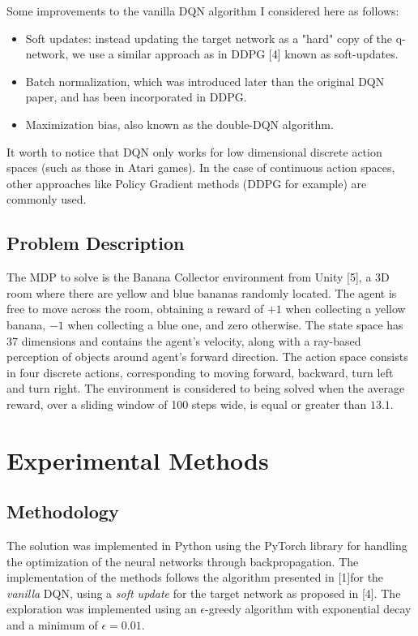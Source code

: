 \documentclass{article}
\begin{document}
Some improvements to the vanilla DQN algorithm I considered here as follows:

\begin{itemize}
	\item Soft updates: instead updating the target network as a "hard" copy of the q-network, we use a similar approach as in DDPG [4] known as soft-updates.
	\item Batch normalization, which was introduced later than the original DQN paper, and has been incorporated in DDPG.
	\item Maximization bias, also known as the double-DQN algorithm.
\end{itemize}

It worth to notice that DQN only works for low dimensional discrete action spaces (such as those in Atari games). In the case of continuous action spaces, other approaches like Policy Gradient methods (DDPG for example) are commonly used.

\subsection{Problem Description}

The MDP to solve is the Banana Collector environment from Unity [5], a 3D room  where there are yellow and blue bananas randomly located. The agent is free to move across the room, obtaining a reward of $+1$ when collecting a yellow banana, $-1$ when collecting a blue one, and zero otherwise. The state space has 37 dimensions and contains the agent’s velocity, along with a ray-based perception of objects around agent’s forward direction. The action space consists in four discrete actions, corresponding to moving forward, backward, turn left and turn right. The environment is considered to being solved when the average reward, over a sliding window of 100 steps wide, is equal or greater than $13.1$. 

\section{Experimental Methods}

\subsection{Methodology}

The solution was implemented in Python using the PyTorch library for handling the optimization of the neural networks through backpropagation. The implementation of the methods follows the algorithm presented in [1]for the \textit{vanilla} DQN, using a \textit{soft update} for the target network as proposed in [4]. The exploration was implemented using an $\epsilon$-greedy algorithm with exponential decay and a minimum of $\epsilon = 0.01$.
\end{document}
